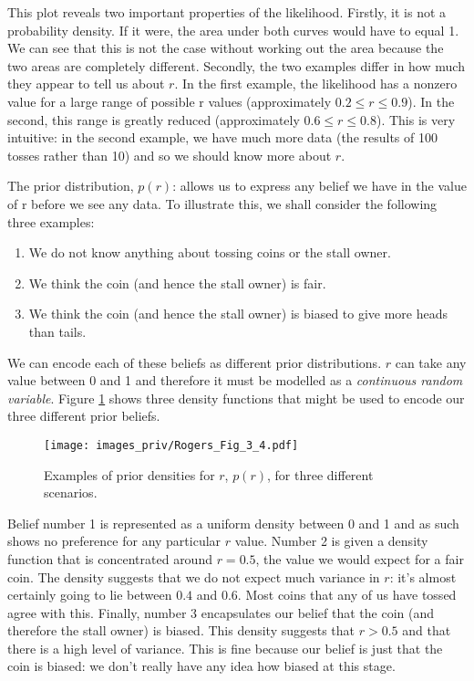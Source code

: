 This plot reveals two important properties of the likelihood. Firstly, it is not a
probability density. If it were, the area under both curves would have to equal 1.
We can see that this is not the case without working out the area because the two
areas are completely different. Secondly, the two examples differ in how much they
appear to tell us about $r$. In the first example, the likelihood has a nonzero value
for a large range of possible r values (approximately $0.2 \leq r \leq 0.9$).
In the second,
this range is greatly reduced (approximately $0.6  \leq r \leq 0.8$).
This is very intuitive:
in the second example, we have much more data (the results of 100 tosses rather
than 10) and so we should know more about $r$.


The prior distribution, $p(r)$: allows us to express any
belief we have in the value of r before we see any data. To illustrate this, we shall
consider the following three examples:
\begin{enumerate}
\item We do not know anything about tossing coins or the stall owner.
\item We think the coin (and hence the stall owner) is fair.
\item We think the coin (and hence the stall owner) is biased to give more heads
than tails.
\end{enumerate}
We can encode each of these beliefs as different prior distributions.
$r$ can take any
value between 0 and 1 and therefore it must be modelled as a \emph{continuous random
variable}.
Figure \ref{fig:Rogers_3_4} shows three density functions that might be used to encode our
three different prior beliefs.

\begin{figure}[h]
{\centering
\texttt{[image: images\_priv/Rogers\_Fig\_3\_4.pdf]}
\par}
\caption{Examples of prior densities for $r$, $p(r)$, for three different scenarios.}
\label{fig:Rogers_3_4}
\end{figure}

Belief number 1 is represented as a uniform density between 0 and 1 and as such
shows no preference for any particular $r$ value. Number 2 is given a density function
that is concentrated around $r = 0.5$, the value we would expect for a fair coin. The
density suggests that we do not expect much variance in $r$: it's almost certainly
going to lie between $0.4$ and $0.6$. Most coins that any of us have tossed agree with
this. Finally, number 3 encapsulates our belief that the coin (and therefore the stall
owner) is biased. This density suggests that $r > 0.5$ and that there is a high level
of variance. This is fine because our belief is just that the coin is biased: we don't
really have any idea how biased at this stage.

